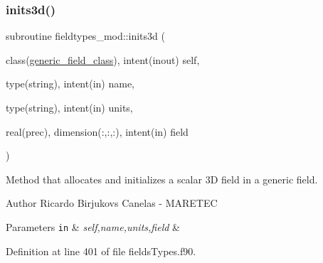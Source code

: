 \subsubsection{\texorpdfstring{inits3d()}{inits3d()}}
{\footnotesize\ttfamily subroutine fieldtypes\+\_\+mod\+::inits3d (\begin{DoxyParamCaption}\item[{class(\mbox{\hyperlink{structfieldtypes__mod_1_1generic__field__class}{generic\+\_\+field\+\_\+class}}), intent(inout)}]{self,  }\item[{type(string), intent(in)}]{name,  }\item[{type(string), intent(in)}]{units,  }\item[{real(prec), dimension(\+:,\+:,\+:), intent(in)}]{field }\end{DoxyParamCaption})\hspace{0.3cm}{\ttfamily [private]}}



Method that allocates and initializes a scalar 3D field in a generic field. 

\begin{DoxyAuthor}{Author}
Ricardo Birjukovs Canelas -\/ M\+A\+R\+E\+T\+EC 
\end{DoxyAuthor}

\begin{DoxyParams}[1]{Parameters}
\mbox{\tt in}  & {\em self,name,units,field} & \\
\hline
\end{DoxyParams}


Definition at line 401 of file fields\+Types.\+f90.


